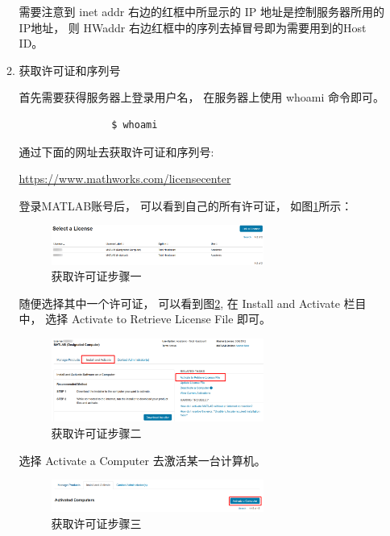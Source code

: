 \documentclass[UTF8]{article}   %
\numberwithin{equation}{section} %
\begin{document}
\begin{enumerate}
\begin{enumerate}
			需要注意到 inet addr 右边的红框中所显示的 IP 地址是控制服务器所用的IP地址，
			则 HWaddr 右边红框中的序列去掉冒号即为需要用到的Host ID。

		\item 获取许可证和序列号
			
			首先需要获得服务器上登录用户名，
			在服务器上使用 whoami 命令即可。

			\begin{verbatim}
			    $ whoami
			\end{verbatim}

			通过下面的网址去获取许可证和序列号:

			\href{https://www.mathworks.com/licensecenter}{https://www.mathworks.com/licensecenter}
			
			登录MATLAB账号后，
			可以看到自己的所有许可证，
			如图{\ref{Fig 获取许可证步骤一}}所示：
			\begin{figure}[H]
			  \centering
			  \includegraphics[width=0.7\textwidth]{./pic/license1}
			  \caption{获取许可证步骤一}
			  \label{Fig 获取许可证步骤一}
			\end{figure}
			
			随便选择其中一个许可证，
			可以看到图{\ref{Fig 获取许可证步骤二}},
			在 Install and Activate 栏目中，
			选择 Activate to Retrieve License File 即可。
			\begin{figure}[H]
			  \centering
			  \includegraphics[width=0.7\textwidth]{./pic/license2}
			  \caption{获取许可证步骤二}
			  \label{Fig 获取许可证步骤二}
			\end{figure}

			选择 Activate a Computer 去激活某一台计算机。
			\begin{figure}[H]
			  \centering
			  \includegraphics[width=0.7\textwidth]{./pic/license3}
			  \caption{获取许可证步骤三}
			  \label{Fig 获取许可证步骤三}
			\end{figure}


\end{enumerate}
\end{enumerate}
\end{document}
